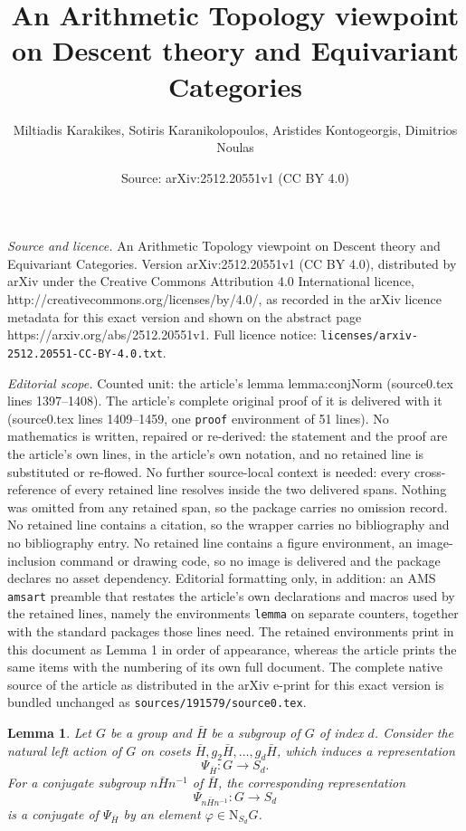 \documentclass[10pt,a4paper]{amsart}
\title{An Arithmetic Topology viewpoint on Descent theory and Equivariant Categories}
\author{Miltiadis Karakikes, Sotiris Karanikolopoulos, Aristides Kontogeorgis, Dimitrios Noulas}
\date{Source: arXiv:2512.20551v1 (CC BY 4.0)}
\newtheorem{lemma}{Lemma}
\begin{document}
\maketitle

\noindent\emph{Source and licence.} An Arithmetic Topology viewpoint on Descent theory and Equivariant Categories. Version arXiv:2512.20551v1 (CC BY 4.0), distributed by arXiv under the Creative Commons Attribution 4.0 International licence, http://creativecommons.org/licenses/by/4.0/, as recorded in the arXiv licence metadata for this exact version and shown on the abstract page https://arxiv.org/abs/2512.20551v1. Full licence notice: \texttt{licenses/arxiv-2512.20551-CC-BY-4.0.txt}.\par\smallskip

\noindent\textit{Editorial scope.} Counted unit: the article's lemma lemma:conjNorm (source0.tex lines 1397--1408). The article's complete original proof of it is delivered with it (source0.tex lines 1409--1459, one \texttt{proof} environment of 51 lines). No mathematics is written, repaired or re-derived: the statement and the proof are the article's own lines, in the article's own notation, and no retained line is substituted or re-flowed.  No further source-local context is needed: every cross-reference of every retained line resolves inside the two delivered spans.  Nothing was omitted from any retained span, so the package carries no omission record.  No retained line contains a citation, so the wrapper carries no bibliography and no bibliography entry.  No retained line contains a figure environment, an image-inclusion command or drawing code, so no image is delivered and the package declares no asset dependency.  Editorial formatting only, in addition: an AMS \texttt{amsart} preamble that restates the article's own declarations and macros used by the retained lines, namely the environments \texttt{lemma} on separate counters, together with the standard packages those lines need.  The retained environments print in this document as Lemma 1 in order of appearance, whereas the article prints the same items with the numbering of its own full document.  The complete native source of the article as distributed in the arXiv e-print for this exact version is bundled unchanged as \texttt{sources/191579/source0.tex}.
\begin{lemma}
  \label{lemma:conjNorm}
Let $G$ be a group and $\bar{H}$ be a subgroup of $G$ of index $d$. Consider the natural left action of $G$ on cosets $\bar{H}, g_2 \bar{H}, \ldots, g_d \bar H$, which induces a representation
\[
  \Psi_{\bar H} \colon G \longrightarrow S_d. 
\]
For a conjugate subgroup $n\bar{H}n^{-1}$ of $\bar{H}$, the corresponding representation
\[
  \Psi_{n \bar H n^{-1}} \colon G \longrightarrow S_d
\]
is a conjugate of $\Psi_{\bar{H}}$ by an element $\varphi \in \mathrm{N}_{S_d}G$.
\end{lemma}
\end{document}
